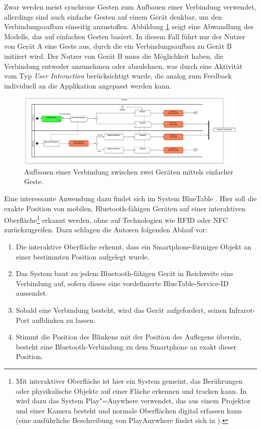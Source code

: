 Zwar werden meist synchrone Gesten zum Aufbauen einer Verbindung verwendet, allerdings sind auch einfache Gesten auf einem Gerät denkbar, um den Verbindungsaufbau einseitig anzustoßen. Abbildung \ref{fig:async_connect} zeigt eine Abwandlung des Modells, das auf einfachen Gesten basiert. In diesem Fall führt nur der Nutzer von Gerät A eine Geste aus, durch die ein Verbindungsaufbau zu Gerät B initiiert wird. Der Nutzer von Gerät B muss die Möglichkeit haben, die Verbindung entweder anzunehmen oder abzulehnen, was durch eine Aktivität vom Typ \textit{User Interaction} berücksichtigt wurde, die analog zum Feedback individuell an die Applikation angepasst werden kann.
\begin{figure}
\centering
\includegraphics[page=1, width=\textwidth]{bilder/connect.pdf}
\caption{Aufbauen einer Verbindung zwischen zwei Geräten mittels einfacher Geste.}
\label{fig:async_connect}
\end{figure}

Eine interessante Anwendung dazu findet sich im System BlueTable \citep{Wilson2007}. Hier soll die exakte Position von mobilen, Bluetooth-fähigen Geräten auf einer interaktiven Oberfläche\footnote{Mit interaktiver Oberfläche ist hier ein System gemeint, das Berührungen oder physikalische Objekte auf einer Fläche erkennen und tracken kann. In \citep{Wilson2007} wird dazu das System Play"=Anywhere verwendet, das aus einem Projektor und einer Kamera besteht und normale Oberflächen digital erfassen kann (eine ausführliche Beschreibung von PlayAnywhere findet sich in \citep{Wilson2005}).} erkannt werden, ohne auf Technologien wie \acs{RFID} oder \ac{NFC} zurückzugreifen. Dazu schlagen die Autoren folgenden Ablauf vor:
\begin{enumerate}
\item Die interaktive Oberfläche erkennt, dass ein Smartphone-förmiges Objekt an einer bestimmten Position aufgelegt wurde.
\item Das System baut zu jedem Bluetooth-fähigen Gerät in Reichweite eine Verbindung auf, sofern dieses eine vordefinierte BlueTable-Service-ID aussendet.
\item Sobald eine Verbindung besteht, wird das Gerät aufgefordert, seinen Infrarot-Port aufblinken zu lassen.
\item Stimmt die Position des Blinkens mit der Position des Auflegens überein, besteht eine Bluetooth-Verbindung zu dem Smartphone an exakt dieser Position.
\end{enumerate}

